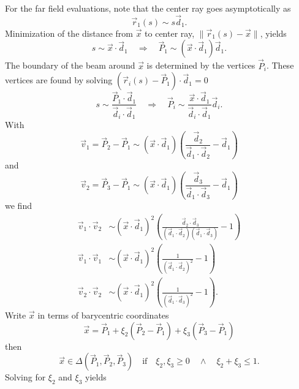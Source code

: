 For the far field evaluations, note that the center ray goes asymptotically as
\begin{equation*}
	\vec{r}_1(s) \sim s\vec{d}_1.
\end{equation*}
Minimization of the distance from $\vec{x}$ to center ray, $\|\vec{r}_1(s)-\vec{x}\|$, yields
\begin{equation*}
	s \sim \vec{x}\cdot \vec{d}_1\quad\Rightarrow\quad \vec{P}_1 \sim (\vec{x}\cdot \vec{d}_1)\vec{d}_1.
\end{equation*}
The boundary of the beam around $\vec{x}$ is determined by the vertices $\vec{P}_i$. These vertices are found by solving $(\vec{r}_i(s)-\vec{P}_1)\cdot \vec{d}_1 = 0$
\begin{equation*}
	s \sim \frac{\vec{P}_1\cdot\vec{d}_1}{\vec{d}_i\cdot\vec{d}_1}\quad\Rightarrow\quad \vec{P}_i \sim \frac{\vec{x}\cdot\vec{d}_1}{\vec{d}_i\cdot\vec{d}_1}\vec{d}_i.
\end{equation*}
With 
\begin{equation*}
	\vec{v}_1 = \vec{P}_2-\vec{P}_1 \sim (\vec{x}\cdot \vec{d}_1)\left(\frac{\vec{d}_2}{\vec{d}_1\cdot \vec{d}_2} - \vec{d}_1\right)
\end{equation*}
and
\begin{equation*}
	\vec{v}_2 = \vec{P}_3-\vec{P}_1 \sim (\vec{x}\cdot \vec{d}_1)\left(\frac{\vec{d}_3}{\vec{d}_1\cdot \vec{d}_3} - \vec{d}_1\right)
\end{equation*}
we find
\begin{align*}
	\vec{v}_1\cdot\vec{v}_2 &\sim (\vec{x}\cdot \vec{d}_1)^2\left(\frac{\vec{d}_2\cdot\vec{d}_3}{(\vec{d}_1\cdot \vec{d}_2)(\vec{d}_1\cdot \vec{d}_3)} - 1\right)\\
	\vec{v}_1\cdot\vec{v}_1 &\sim (\vec{x}\cdot \vec{d}_1)^2\left(\frac{1}{(\vec{d}_1\cdot \vec{d}_2)^2} - 1\right)\\
	\vec{v}_2\cdot\vec{v}_2 &\sim (\vec{x}\cdot \vec{d}_1)^2\left(\frac{1}{(\vec{d}_1\cdot \vec{d}_3)^2} - 1\right).
\end{align*}
Write $\vec{x}$ in terms of barycentric coordinates 
\begin{equation*}
	\vec{x} = \vec{P}_1+\xi_2(\vec{P}_2-\vec{P}_1)+\xi_3(\vec{P}_3-\vec{P}_1)
\end{equation*}
then
\begin{equation*}
	\vec{x}\in \Delta(\vec{P}_1,\vec{P}_2,\vec{P}_3)\quad\text{if}\quad \xi_2,\xi_3\geq 0 \quad\wedge \quad\xi_2+\xi_3 \leq 1.
\end{equation*}
Solving for $\xi_2$ and $\xi_3$ yields 
